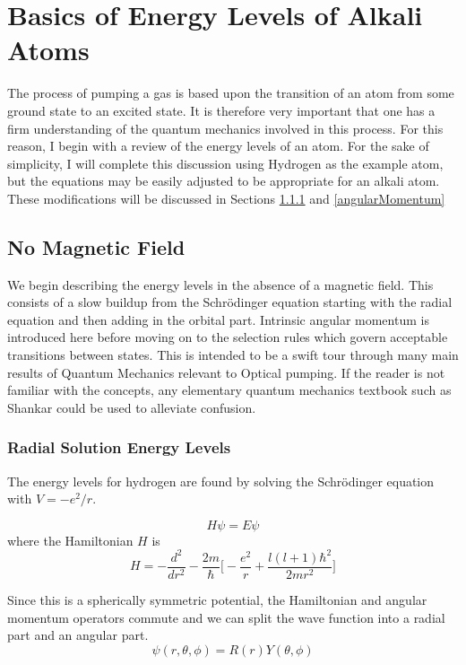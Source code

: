 \documentclass[letter,12pt]{article}
\newcommand{\schr}{Schr\"odinger}
\begin{document}
\section{Basics of Energy Levels of Alkali Atoms}
The process of pumping a gas is based upon the transition
of an atom from some ground state to an excited state. 
It is therefore very important that one has a firm 
understanding of the quantum mechanics involved in this 
process. For this reason, I begin with a review of the energy
levels of an atom. For the sake of simplicity, I will complete
this discussion using
Hydrogen as the example atom, but the equations may be 
easily adjusted to be appropriate for an alkali atom.
These modifications will be discussed in Sections \ref{energyLevels}
and \ref{angularMomentum}
	\subsection{No Magnetic Field}
    We begin describing the energy levels in the absence of 
    a magnetic field. This consists of a slow buildup 
    from the Schr\"odinger equation starting with the radial
    equation and then adding in the orbital part. Intrinsic 
    angular momentum is introduced here before moving on to
    the selection rules which govern acceptable transitions
    between states. This is intended to be a swift tour through
	many main results of Quantum Mechanics relevant to 
	Optical pumping. If the reader is not familiar with the 
	concepts, any elementary quantum mechanics textbook
	such as Shankar could be used to alleviate confusion.
		\subsubsection{Radial Solution Energy Levels}\label{energyLevels}
		The energy levels for hydrogen are found by solving the
		{\schr} equation with $V=-e^2/r$. 

		\begin{equation}
		  H\psi = E\psi
		\end{equation}
		where the Hamiltonian $H$ is 
		\begin{equation}
			H=-\frac{d^2}{dr^2}-\frac{2m}{\hbar}\Big[-\frac{e^2}{r} + \frac{l(l+1)\hbar^2}{2mr^2}\Big]
		\end{equation}
		
		Since this is a spherically
		symmetric potential, the Hamiltonian and angular momentum
		operators commute and we can split the wave function into a
		radial part and an angular part. 
		\begin{equation}
			\psi(r,\theta,\phi)=R(r)Y(\theta,\phi)
		\end{equation}
\end{document}

